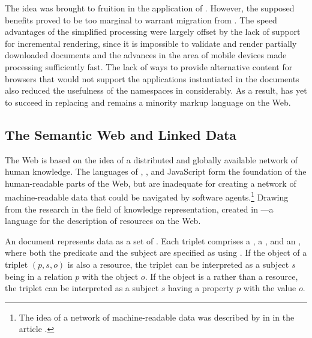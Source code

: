 The idea was brought to fruition in the  application of
. However, the supposed benefits proved to be too marginal to
warrant migration from . The speed advantages of the simplified
processing were largely offset by the lack of support for incremental rendering,
since it is impossible to validate and render partially downloaded
 documents and the advances in the area of mobile devices made
 processing sufficiently fast. The lack of ways to provide
alternative content for browsers that would not support the 
applications instantiated in the  documents also reduced the
usefulness of the  namespaces in  considerably. As
a result,  has yet to succeed in replacing  and
remains a minority markup language on the Web.


\subsection{The Semantic Web and Linked Data}\label{sec:semantic-web}
The Web is based on the idea of a distributed and globally available network of
human knowledge. The languages of , , 
and JavaScript form the foundation of the human-readable parts of the Web, but
are inadequate for creating a network of machine-readable data that could be
navigated by software agents.\footnote{
  The idea of a network of machine-readable data was described by
   in \citeyear{bernerslee06} in the article
  .}
Drawing from the research in the field of knowledge representation,
 created  in \citeyear{lassira99}---a language for the
description of resources on the Web.

An  document represents data as a set of %
. Each triplet comprises a
, a %
, and an ,
where both the predicate and the subject are specified as 
 using . If the object of a triplet
$(p,s,o)$ is also a resource, the triplet can be interpreted as a subject $s$
being in a relation $p$ with the object $o$. If the object is a   rather than a resource, the triplet can be
interpreted as a subject $s$ having a property $p$ with the value $o$.

